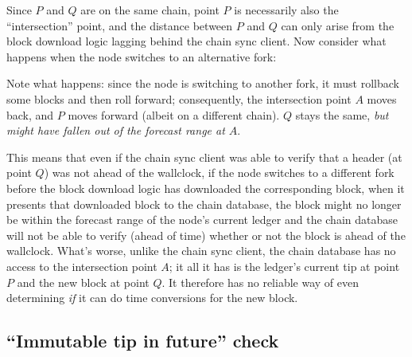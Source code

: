Since $P$ and $Q$ are on the same chain,  point $P$ is necessarily also the
``intersection'' point, and the distance between $P$ and $Q$ can only arise from
the block download logic lagging behind the chain sync client.
Now consider what happens when the node switches to an alternative fork:

\begin{center}
\end{center}

Note what happens: since the node is switching to another fork, it must rollback
some blocks and then roll forward; consequently, the intersection point $A$
moves back, and $P$ moves forward (albeit on a different chain). $Q$ stays the
same, \emph{but might have fallen out of the forecast range at $A$}.

This means that even if the chain sync client was able to verify that a header
(at point $Q$) was not ahead of the wallclock, if the node switches to a
different fork before the block download logic has downloaded the corresponding
block, when it presents that downloaded block to the chain database, the block
might no longer be within the forecast range of the node's current ledger and
the chain database will not be able to verify (ahead of time) whether or not the
block is ahead of the wallclock. What's worse, unlike the chain sync client, the
chain database has no access to the intersection point $A$; it all it has is the
ledger's current tip at  point $P$ and the new block at point $Q$. It therefore
has no reliable way of even determining \emph{if} it can do time conversions for
the new block.

\subsection{``Immutable tip in future'' check}
\label{time:imm-tip-in-future}

